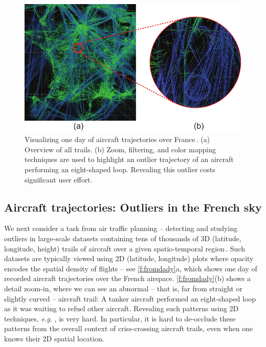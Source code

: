 \begin{figure}
\centering
\includegraphics [width=\textwidth]{images/aircraft.pdf}

\caption[Visualizing one day of aircraft trajectories over France.]{Visualizing one day of aircraft trajectories over France\,\cite{hurter2009fromdady}. (a) Overview of all trails. (b) Zoom, filtering, and color mapping techniques are used to highlight an outlier trajectory of an aircraft performing an eight-shaped loop. Revealing this outlier costs significant user effort.}
\label{f:fromdady}

\end{figure}


\subsection{Aircraft trajectories: Outliers in the French sky}
\label{sec:atc}
%
%
We next consider a task from air traffic planning -- detecting and studying outliers in large-scale datasets containing tens of thousands of 3D (latitude, longitude, height) trails of aircraft over a given spatio-temporal region\,\cite{hurter2014interactive}. Such datasets are typically viewed using 2D (latitude, longitude) plots where opacity encodes the spatial density of flights -- see \autoref{f:fromdady}a, which shows one day of recorded aircraft trajectories over the French airspace. \autoref{f:fromdady}(b) shows a detail zoom-in, where we can see an abnormal -- that is, far from straight or slightly curved -- aircraft trail: A tanker aircraft performed an eight-shaped loop as it was waiting to refuel other aircraft. Revealing such patterns using 2D techniques, \emph{e.g.} \cite{hurter2009fromdady}, is very hard. In particular, it is hard to de-occlude these patterns from the overall context of criss-crossing aircraft trails, even when one knows their 2D spatial location.

